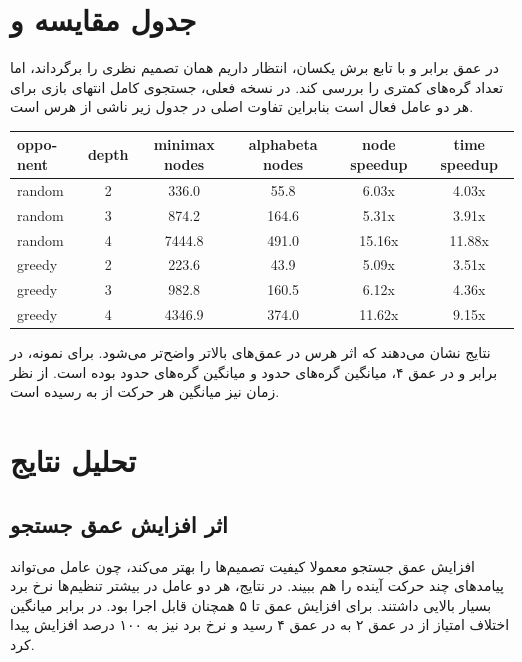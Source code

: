 \documentclass[10.5pt]{exam}
\begin{document}
\section{جدول مقایسه  و }
در عمق برابر و با تابع برش یکسان، انتظار داریم
همان تصمیم نظری
را برگرداند، اما تعداد گره‌های کمتری را بررسی کند. در نسخه فعلی، جستجوی کامل انتهای بازی برای هر دو عامل فعال است بنابراین تفاوت اصلی در جدول زیر ناشی از هرس
است.

\begin{latin}
\small
\begin{tabular}{l c c c c c}
\textbf{opponent} & \textbf{depth} & \textbf{minimax nodes} & \textbf{alphabeta nodes} & \textbf{node speedup} & \textbf{time speedup} \\
\hline
random & 2 & 336.0 & 55.8 & 6.03x & 4.03x \\
random & 3 & 874.2 & 164.6 & 5.31x & 3.91x \\
random & 4 & 7444.8 & 491.0 & 15.16x & 11.88x \\
greedy & 2 & 223.6 & 43.9 & 5.09x & 3.51x \\
greedy & 3 & 982.8 & 160.5 & 6.12x & 4.36x \\
greedy & 4 & 4346.9 & 374.0 & 11.62x & 9.15x \\
\end{tabular}
\end{latin}

نتایج نشان می‌دهند که اثر هرس در عمق‌های بالاتر واضح‌تر می‌شود. برای نمونه، در برابر
و در عمق ۴، میانگین گره‌های
حدود
و میانگین گره‌های
حدود
بوده است. از نظر زمان نیز میانگین هر حرکت از
به
رسیده است.

\section{تحلیل نتایج}
\subsection{اثر افزایش عمق جستجو}
افزایش عمق جستجو معمولا کیفیت تصمیم‌ها را بهتر می‌کند، چون عامل می‌تواند پیامدهای چند حرکت آینده را هم ببیند. در نتایج، هر دو عامل در بیشتر تنظیم‌ها نرخ برد بسیار بالایی داشتند. برای
افزایش عمق تا ۵ همچنان قابل اجرا بود. در برابر
میانگین اختلاف امتیاز از
در عمق ۲ به
در عمق ۴ رسید و نرخ برد نیز به ۱۰۰ درصد افزایش پیدا کرد.
\end{document}
